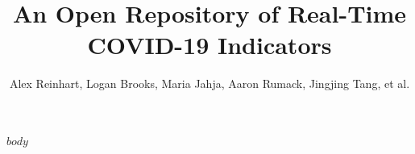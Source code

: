 \documentclass[9pt,twoside,lineno]{pnas-new}
\title{An Open Repository of Real-Time COVID-19 Indicators}
\author{Alex Reinhart, Logan Brooks, Maria Jahja, Aaron Rumack, Jingjing Tang,
  et al.}
\begin{document}
$body$






% 
\end{document}
